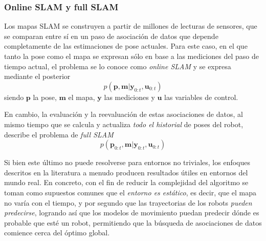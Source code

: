 \subsubsection{Online SLAM y full SLAM}
Los mapas SLAM se construyen a partir de millones de lecturas de sensores, que se comparan entre sí en un paso de asociación de datos que depende completamente de las estimaciones de pose actuales. Para este caso, en el que tanto la pose como el mapa se expresan sólo en base a las mediciones del paso de tiempo actual, el problema se lo conoce como \textit{online SLAM} y se expresa mediante el posterior
\begin{equation}
    p(\bm{p},\bm{m}|\bm{y}_{0:t},\bm{u}_{0:t})
\end{equation}
siendo $\bm{p}$ la pose, $\bm{m}$ el mapa, $\bm{y}$ las mediciones y $\bm{u}$ las variables de control.

En cambio, la evaluación y la reevaluación de estas asociaciones de datos, al mismo tiempo que se calcula y actualiza \textit{todo el historial} de poses del robot, describe el problema de \textit{full SLAM} \cite{dissanayake2001}
\begin{equation}
    p(\bm{p}_{0:t},\bm{m}|\bm{y}_{0:t},\bm{u}_{0:t})
\end{equation}

Si bien este último no puede resolverse para entornos no triviales, los enfoques descritos en la literatura a menudo producen resultados útiles en entornos del mundo real. En concreto, con el fin de reducir la complejidad del algoritmo se toman como supuestos comunes que el \textit{entorno es estático}, es decir, que el mapa no varía con el tiempo, y por segundo que las trayectorias de los robots \textit{pueden predecirse}, logrando así que los modelos de movimiento puedan predecir dónde es probable que esté un robot, permitiendo que la búsqueda de asociaciones de datos comience cerca del óptimo global.

